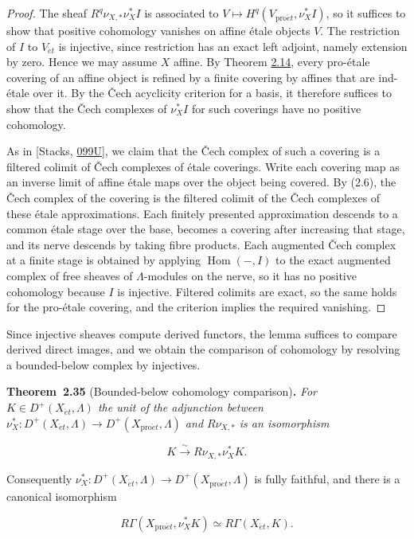 \documentclass[11pt]{article}
\newenvironment{bpstatement}[2]{\par\addvspace{0.6\baselineskip}\noindent\textbf{#1}#2\textbf{.}\enspace\ignorespaces}
  {\par\addvspace{0.4\baselineskip}}
\newenvironment{bpstatementit}[2]{\begin{bpstatement}{#1}{#2}\itshape\ignorespaces}{\end{bpstatement}}
\providecommand{\Hom}{}\renewcommand{\Hom}{\operatorname{Hom}}
\begin{document}
\begin{proof}[{Proof}]\label{bp99}%
The sheaf \(R^q\nu_{X,*}\nu_X^*I\) is associated to \(V\mapsto H^q(V_{\mathrm{pro}\acute{e}t},\nu_X^*I)\), so it suffices to show that positive cohomology vanishes on affine étale objects \(V\). The restriction of \(I\) to \(V_{\acute{e}t}\) is injective, since restriction has an exact left adjoint, namely extension by zero. Hence we may assume \(X\) affine. By Theorem \hyperref[bp40]{2.14}, every pro-étale covering of an affine object is refined by a finite covering by affines that are ind-étale over it. By the Čech acyclicity criterion for a basis, it therefore suffices to show that the Čech complexes of \(\nu_X^*I\) for such coverings have no positive cohomology.

As in [Stacks, \href{https://stacks.math.columbia.edu/tag/099U}{099U}], we claim that the Čech complex of such a covering is a filtered colimit of Čech complexes of étale coverings. Write each covering map as an inverse limit of affine étale maps over the object being covered. By (2.6), the Čech complex of the covering is the filtered colimit of the Čech complexes of these étale approximations. Each finitely presented approximation descends to a common étale stage over the base, becomes a covering after increasing that stage, and its nerve descends by taking fibre products. Each augmented Čech complex at a finite stage is obtained by applying \(\Hom(-,I)\) to the exact augmented complex of free sheaves of \(\Lambda\)-modules on the nerve, so it has no positive cohomology because \(I\) is injective. Filtered colimits are exact, so the same holds for the pro-étale covering, and the criterion implies the required vanishing.
\end{proof}

\label{bp100}%
Since injective sheaves compute derived functors, the lemma suffices to compare derived direct images, and we obtain the comparison of cohomology by resolving a bounded-below complex by injectives.

\label{bp101}%
\begin{bpstatementit}{Theorem~2.35}{ (Bounded-below cohomology comparison)}
For \(K\in D^+(X_{\acute{e}t},\Lambda)\) the unit of the adjunction between \(\nu_X^*:D^+(X_{\acute{e}t},\Lambda)\to D^+(X_{\mathrm{pro}\acute{e}t},\Lambda)\) and \(R\nu_{X,*}\) is an isomorphism

\[
K\xrightarrow{\ \sim\ }R\nu_{X,*}\nu_X^*K.
\tag{2.7}
\]

Consequently \(\nu_X^*:D^+(X_{\acute{e}t},\Lambda)\to D^+(X_{\mathrm{pro}\acute{e}t},\Lambda)\) is fully faithful, and there is a canonical isomorphism

\[
R\Gamma(X_{\mathrm{pro}\acute{e}t},\nu_X^*K)
\simeq R\Gamma(X_{\acute{e}t},K).
\]
\end{bpstatementit}
\end{document}
